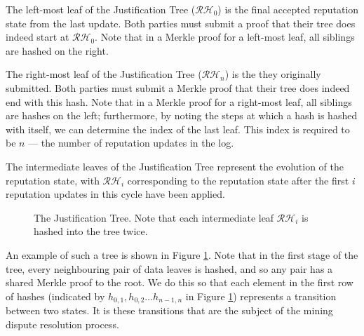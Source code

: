 The left-most leaf of the Justification Tree ($\mathcal{RH}_0$) is the final accepted reputation state from the last update. Both parties must submit a proof that their tree does indeed start at $\mathcal{RH}_0$. Note that in a Merkle proof for a left-most leaf, all siblings are hashed on the right.

The right-most leaf of the Justification Tree ($\mathcal{RH}_n$) is the  they originally submitted. Both parties must submit a Merkle proof that their tree does indeed end with this hash. Note that in a Merkle proof for a right-most leaf, all siblings are hashes on the left; furthermore, by noting the steps at which a hash is hashed with itself, we can determine the index of the last leaf. This index is required to be $n$ --- the number of reputation updates in the log.

The intermediate leaves of the Justification Tree represent the evolution of the reputation state, with $\mathcal{RH}_i$ corresponding to the reputation state after the first $i$ reputation updates in this cycle have been applied. 

\begin{figure}
\centering
{}
\caption{The Justification Tree. Note that each intermediate leaf $\mathcal{RH}_i$ is hashed into the tree twice. }
\label{fig:justification-tree}
\end{figure}
An example of such a tree is shown in Figure \ref{fig:justification-tree}. Note that in the first stage of the tree, every neighbouring pair of data leaves is hashed, and so any pair has a shared Merkle proof to the root. We do this so that each element in the first row of hashes (indicated by $h_{0,1}, h_{0,2} \ldots h_{n-1,n}$ in Figure \ref{fig:justification-tree}) represents a transition between two states. It is these transitions that are the subject of the mining dispute resolution process.

